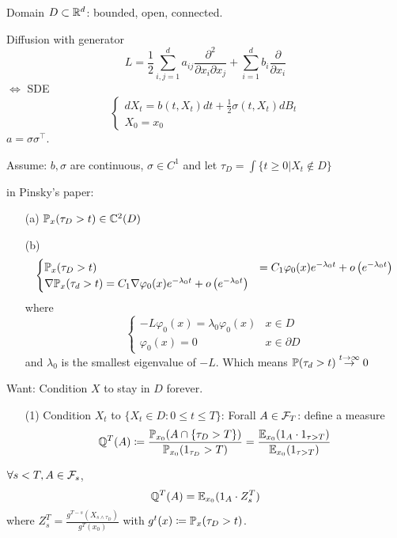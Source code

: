 Domain $D\subset\mathbb{R}^d$: bounded, open, connected.

Diffusion with generator 
\[L=\frac{1}{2}\sum_{i,j=1}^d a_{ij}\frac{\partial^2}{\partial x_i\partial x_j}+\sum_{i=1}^d b_i \frac{\partial}{\partial x_i}\] 
$\iff$ SDE 
\[\begin{cases}
    dX_t=b(t,X_t)dt+\frac{1}{2}\sigma(t,X_t)dB_t\\
    X_0=x_0
\end{cases}\]
$a=\sigma\sigma^\intercal$.

Assume: $b,\sigma$ are continuous, $\sigma\in C^1$ and let $\tau_D=\int\{t\geq 0|X_t\notin D\}$

 in Pinsky's paper:
\begin{enumerate}
    \item[(a)] $\mathbb{P}_x(\tau_D>t)\in\mathbb{C}^2(D)$
    \item[(b)] \[\begin{cases}
        \mathbb{P}_x(\tau_D>t)&=C_1\varphi_0(x)e^{-\lambda_0 t}+ o\left(e^{-\lambda_0t}\right)\\
        \nabla \mathbb{P}_x(\tau_d>t)=C_1\nabla \varphi_0(x)e^{-\lambda_0t}+o\left(e^{-\lambda_0t}\right)
    \end{cases}\] where \[\begin{cases}
        -L\varphi_0(x)=\lambda_0\varphi_0(x) & x\in D\\
        \varphi_0(x)=0 & x\in\partial D
    \end{cases}\] and $\lambda_0$ is the smallest eigenvalue of $-L$. 
    Which means $\mathbb{P}(\tau_d>t)\stackrel{t\to \infty}{\to} 0$
\end{enumerate}

Want: Condition $X$ to stay in $D$ forever.

\begin{enumerate}
    \item[(1)] Condition $X_t$ to $\{X_t\in D:0\leq t\leq T\}$: Forall $A\in\mathcal{F}_T$: define a measure \[\mathbb{Q}^T(A)\coloneqq \frac{\mathbb{P}_{x_0}(A\cap \{\tau_D>T\})}{\mathbb{P}_{x_0}(1_{\tau_D}>T)}=\frac{\mathbb{E}_{x_0}(1_A\cdot 1_{\tau> T})}{\mathbb{E}_{x_0}(1_{\tau>T})}\] 
\end{enumerate}

\begin{lemma}\label{lem:2.10}
    $\forall s<T,A\in\mathcal{F}_s$,
    \[\mathbb{Q}^T(A)=\mathbb{E}_{x_0}(1_A\cdot Z_s^T)\]
    where $Z_s^T=\frac{g^{T-s}(X_{s\land \tau_D})}{g^T(x_0)}$ with $g^t(x)\coloneqq \mathbb{P}_x(\tau_D>t)$.
\end{lemma}


